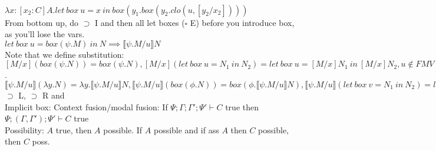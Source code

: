 \\ $\lambda x : [x_2:C]A.let\ box\ u = x\ in\ box(y_1.box(y_2.clo(u,[y_2/x_2])))$
\\ From bottom up, do $\supset$ I and then all let boxes ($\square$ E) before you
introduce box, as you'll lose the vars.
\\ $let\ box\ u = box(\psi.M)\ in\ N \implies \llbracket
\psi.M/u \rrbracket N$
\\ Note that we define substitution:
	$[M/x](box(\psi.N)) = box(\psi.N),[M/x](let\ box\ u = N_1\ in\ N_2)= let\ box\ u = [M/x]N_1\ in
	\ [M/x]N_2, u \notin FMV(M), [M/x](clo(u, \sigma)) = clo(u,
        [M/x]\sigma)$. $\llbracket \psi. M/u \rrbracket (\lambda y.N)
        = \lambda y. \llbracket \psi.M/u \rrbracket N,
	\llbracket \psi.M/u \rrbracket(box (\phi.N)) =
        box(\phi.\llbracket \psi.M/u \rrbracket N), \llbracket
        \psi.M/u \rrbracket(let\ box\ v = N_1\ in\ N_2) = let\ box\ v
        = \llbracket \psi.M/u \rrbracket N_1\ in \llbracket \psi.M/u
        \rrbracket N_2, v \notin FMV(M), \llbracket \psi . M /u \rrbracket clo(v, \sigma) = clo(v, \llbracket \psi.M/u\rrbracket \sigma)
$
\\$\supset$ L, $\supset$ R and 
\\ Implicit box:
Context fusion/modal fusion: If $\Psi; \Gamma; \Gamma' ; \Psi' \vdash C$ true then $\Psi;
(\Gamma, \Gamma') ; \Psi' \vdash C$ true
\\ Possibility: $A$ true, then $A$ possible. If $A$ possible and if
ass $A$ then $C$ possible, then $C$ poss.
\\ 
